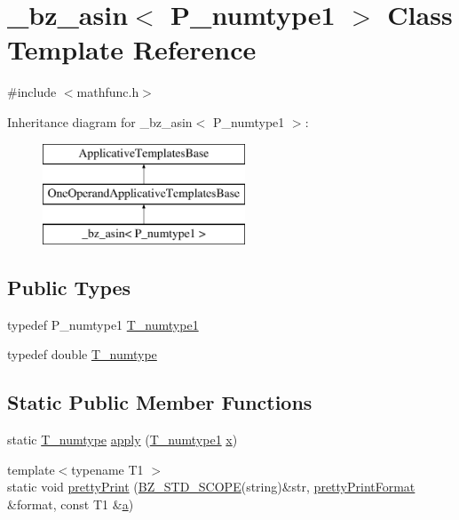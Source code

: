 \hypertarget{class__bz__asin}{}\section{\+\_\+bz\+\_\+asin$<$ P\+\_\+numtype1 $>$ Class Template Reference}
\label{class__bz__asin}


{\ttfamily \#include $<$mathfunc.\+h$>$}

Inheritance diagram for \+\_\+bz\+\_\+asin$<$ P\+\_\+numtype1 $>$\+:\begin{figure}[H]
\begin{center}
\leavevmode
\includegraphics[height=3.000000cm]{class__bz__asin}
\end{center}
\end{figure}
\subsection*{Public Types}
\begin{DoxyCompactItemize}
\item 
typedef P\+\_\+numtype1 \hyperlink{class__bz__asin_ae59db849e4c4ae39feae5b388e5fc87c}{T\+\_\+numtype1}
\item 
typedef double \hyperlink{class__bz__asin_a9c900870692d1a1686b894a94ade0d45}{T\+\_\+numtype}
\end{DoxyCompactItemize}
\subsection*{Static Public Member Functions}
\begin{DoxyCompactItemize}
\item 
static \hyperlink{class__bz__asin_a9c900870692d1a1686b894a94ade0d45}{T\+\_\+numtype} \hyperlink{class__bz__asin_a3b4fdc0a072b6cafcbd4be26a5efe7d6}{apply} (\hyperlink{class__bz__asin_ae59db849e4c4ae39feae5b388e5fc87c}{T\+\_\+numtype1} \hyperlink{vecnorm1_8cc_ac73eed9e41ec09d58f112f06c2d6cb63}{x})
\item 
{\footnotesize template$<$typename T1 $>$ }\\static void \hyperlink{class__bz__asin_a9aafc454d523e1564bdffc82607a97c2}{pretty\+Print} (\hyperlink{numinquire_8h_a2b24ffc3b4ef9803956bc7715c6c7b83}{B\+Z\+\_\+\+S\+T\+D\+\_\+\+S\+C\+O\+P\+E}(string)\&str, \hyperlink{classprettyPrintFormat}{pretty\+Print\+Format} \&format, const T1 \&\hyperlink{gen__mat5files_8m_aae328bf20413f220e38aec4d95bfd6da}{a})
\end{DoxyCompactItemize}


